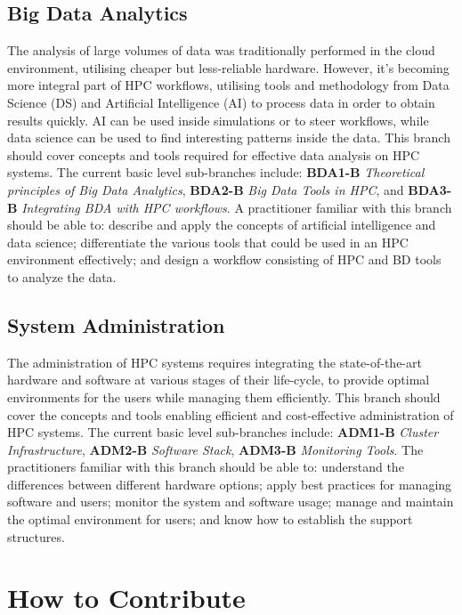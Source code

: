\documentclass[jocse]{jocseart}
\begin{document}
\subsection{Big Data Analytics}

The analysis of large volumes of data was traditionally performed in the cloud environment, utilising cheaper but less-reliable hardware. However, it's becoming more integral part of HPC workflows, utilising tools and methodology from Data Science (DS) and Artificial Intelligence (AI) to process data in order to obtain results quickly. AI can be used inside simulations or to steer workflows, while data science can be used to find interesting patterns inside the data. This branch should cover concepts and tools required for effective data analysis on HPC systems. The current basic level sub-branches include: \textbf{BDA1-B} \textit{Theoretical principles of Big Data Analytics}, \textbf{BDA2-B} \textit{Big Data Tools in HPC}, and \textbf{BDA3-B} \textit{Integrating BDA with HPC workflows}. A practitioner familiar with this branch should be able to: describe and apply the concepts of artificial intelligence and data science; differentiate the various tools that could be used in an HPC environment effectively; and design a workflow consisting of HPC and BD tools to analyze the data.

\subsection{System Administration}

The administration of HPC systems requires integrating the state-of-the-art hardware and software at various stages of their life-cycle, to provide optimal environments for the users while managing them efficiently. This branch should cover the concepts and tools enabling efficient and cost-effective administration of HPC systems. The current basic level sub-branches include: \textbf{ADM1-B} \textit{Cluster Infrastructure}, \textbf{ADM2-B} \textit{Software Stack}, \textbf{ADM3-B} \textit{Monitoring Tools}. The practitioners familiar with this branch should be able to: understand the differences between different hardware options; apply best practices for managing software and users; monitor the system and software usage; manage and maintain the optimal environment for users; and know how to establish the support structures.


\section{How to Contribute}
\end{document}
